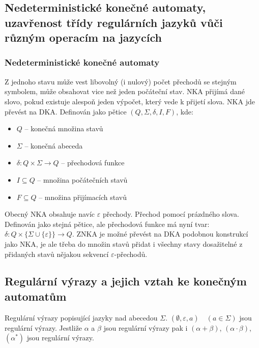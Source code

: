 \subsection[NKA, Regulární jazyky]{Nedeterministické konečné automaty, uzavřenost třídy regulárních jazyků vůči různým operacím na jazycích}
\subsubsection{Nedeterministické konečné automaty}
Z jednoho stavu může vest libovolný (i nulový) počet přechodů se stejným symbolem, může obsahovat vice než jeden počáteční stav. NKA přijímá dané slovo, pokud existuje alespoň jeden výpočet, který vede k přijetí slova. NKA jde převést na DKA.
Definován jako pětice $(Q, \Sigma, \delta, I, F)$, kde:
\begin{itemize}
\item $Q$ -- konečná množina stavů
\item $\Sigma$ -- konečná abeceda
\item $\delta : Q\times \Sigma \rightarrow Q$ -- přechodová funkce
\item $I \subseteq Q$ -- množina počátečních stavů
\item $F \subseteq Q$ -- množina přijímacích stavů
\end{itemize}

Obecný NKA obsahuje navíc $\varepsilon$ přechody. Přechod pomocí prázdného slova. Definován jako stejná pětice, ale přechodová funkce má nyní tvar:
$\delta : Q\times \{ \Sigma \cup \{\varepsilon\} \} \rightarrow Q$. ZNKA je možné převést na DKA podobnou konstrukcí jako NKA, je ale třeba do množin stavů přidat i všechny stavy dosažitelné z přidaných stavů nějakou sekvencí $\varepsilon$-přechodů.
\subsection{Regulární výrazy a jejich vztah ke konečným automatům}
Regulární výrazy popisující jazyky nad abecedou $\Sigma$. $(\emptyset, \varepsilon, a) \quad(a \in \Sigma)$ jsou regulární výrazy. Jestliže 
$\alpha$ a $\beta$ jsou regulární výrazy pak i $(\alpha + \beta)$, $(\alpha \cdot \beta)$, $(\alpha^*)$ jsou regulární výrazy.
